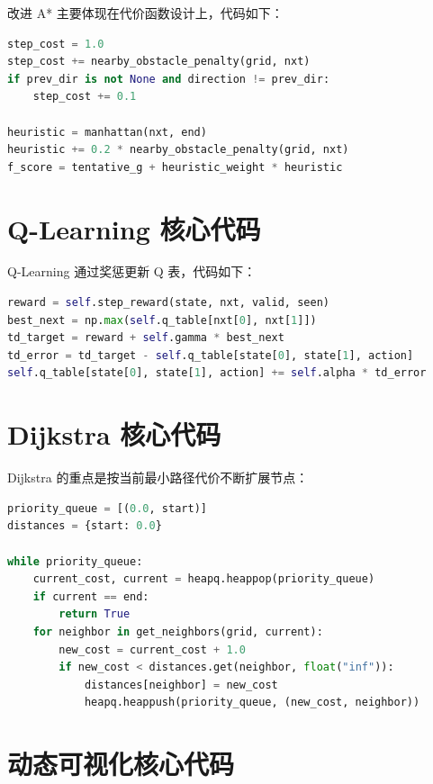 改进 A* 主要体现在代价函数设计上，代码如下：

\begin{lstlisting}[language=Python,caption={改进 A* 的附加代价},label={code:improved-astar}]
step_cost = 1.0
step_cost += nearby_obstacle_penalty(grid, nxt)
if prev_dir is not None and direction != prev_dir:
    step_cost += 0.1

heuristic = manhattan(nxt, end)
heuristic += 0.2 * nearby_obstacle_penalty(grid, nxt)
f_score = tentative_g + heuristic_weight * heuristic
\end{lstlisting}

\section{Q-Learning 核心代码}

Q-Learning 通过奖惩更新 Q 表，代码如下：

\begin{lstlisting}[language=Python,caption={Q-Learning 的价值更新},label={code:qlearning}]
reward = self.step_reward(state, nxt, valid, seen)
best_next = np.max(self.q_table[nxt[0], nxt[1]])
td_target = reward + self.gamma * best_next
td_error = td_target - self.q_table[state[0], state[1], action]
self.q_table[state[0], state[1], action] += self.alpha * td_error
\end{lstlisting}

\section{Dijkstra 核心代码}

Dijkstra 的重点是按当前最小路径代价不断扩展节点：

\begin{lstlisting}[language=Python,caption={Dijkstra 的核心实现},label={code:dijkstra}]
priority_queue = [(0.0, start)]
distances = {start: 0.0}

while priority_queue:
    current_cost, current = heapq.heappop(priority_queue)
    if current == end:
        return True
    for neighbor in get_neighbors(grid, current):
        new_cost = current_cost + 1.0
        if new_cost < distances.get(neighbor, float("inf")):
            distances[neighbor] = new_cost
            heapq.heappush(priority_queue, (new_cost, neighbor))
\end{lstlisting}

\section{动态可视化核心代码}


